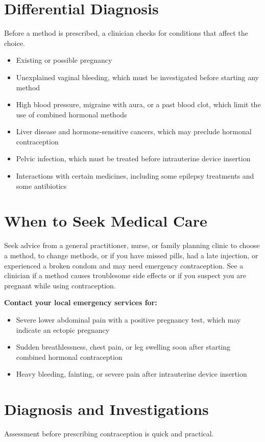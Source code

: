 \section*{Differential Diagnosis}
Before a method is prescribed, a clinician checks for conditions that affect the choice.

\begin{itemize}
    \item Existing or possible pregnancy
    \item Unexplained vaginal bleeding, which must be investigated before starting any method
    \item High blood pressure, migraine with aura, or a past blood clot, which limit the use of combined hormonal methods
    \item Liver disease and hormone-sensitive cancers, which may preclude hormonal contraception
    \item Pelvic infection, which must be treated before intrauterine device insertion
    \item Interactions with certain medicines, including some epilepsy treatments and some antibiotics
\end{itemize}

\section*{When to Seek Medical Care}
Seek advice from a general practitioner, nurse, or family planning clinic to choose a method, to change methods, or if you have missed pills, had a late injection, or experienced a broken condom and may need emergency contraception. See a clinician if a method causes troublesome side effects or if you suspect you are pregnant while using contraception.

\textbf{Contact your local emergency services for:}
\begin{itemize}
    \item Severe lower abdominal pain with a positive pregnancy test, which may indicate an ectopic pregnancy
    \item Sudden breathlessness, chest pain, or leg swelling soon after starting combined hormonal contraception
    \item Heavy bleeding, fainting, or severe pain after intrauterine device insertion
\end{itemize}

\section*{Diagnosis and Investigations}
Assessment before prescribing contraception is quick and practical.

